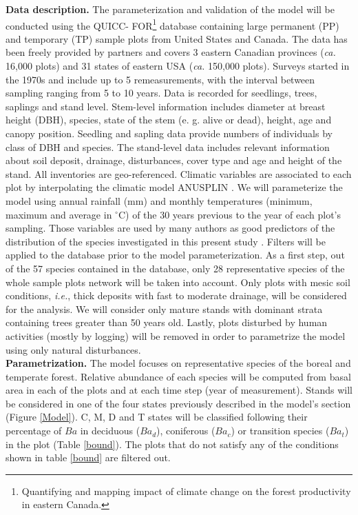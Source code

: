 \textbf{Data description.} The parameterization and validation of the model
will be conducted using the QUICC- FOR\footnote{Quantifying and mapping impact
of climate change on the forest productivity in eastern Canada.} database
containing large permanent (PP) and temporary (TP) sample plots from United
States and Canada. The data has been freely provided by partners and covers 3
eastern Canadian provinces (\textit{ca.} 16,000 plots) and 31 states of
eastern USA (\textit{ca.} 150,000 plots). Surveys started in the 1970s and
include up to 5 remeasurements, with the interval between sampling ranging
from 5 to 10 years. Data is recorded for seedlings, trees, saplings and stand
level. Stem-level information includes diameter at breast height (DBH),
species, state of the stem (e. g. alive or dead), height, age and canopy
position. Seedling and sapling data provide numbers of individuals by class of
DBH and species. The stand-level data includes relevant information about soil
deposit, drainage, disturbances, cover type and age and height of the stand.
All  inventories are geo-referenced. Climatic variables are associated to each
plot by interpolating  the climatic model ANUSPLIN \cite{McKenney2011} . We
will parameterize the model using annual rainfall (mm) and monthly
temperatures (minimum, maximum and average in \ensuremath{^\circ}C) of the 30
years previous to the year of each plot's sampling. Those variables are used
by many authors as good predictors of the distribution of the species
investigated in this present study \cite{Goldblum2010}. Filters will be
applied to the database prior to the model parameterization. As a first step,
out of the 57 species contained in the database, only 28 representative
species of the whole sample plots network will be taken into account. Only
plots with mesic soil conditions, \textit{i.e.}, thick deposits with fast to
moderate drainage, will be considered for the analysis. We will consider only
mature stands with dominant strata containing trees greater than 50 years old.
Lastly, plots disturbed by human activities (mostly by logging) will be
removed in order to parametrize the model using only natural disturbances. \\

\textbf{Parametrization.} The model focuses on representative species of the
boreal and temperate forest. Relative  abundance of each species will be
computed from basal area in each of the plots and at each time step (year of
measurement). Stands will be considered in one of the four states previously
described in the model's section (Figure \ref{Model}). C, M, D and T states
will be classified following their percentage of $Ba$ in deciduous ($Ba_d$),
coniferous ($Ba_c$) or transition species ($Ba_t$) in the plot (Table
\ref{bound}). The plots that do not satisfy any of the conditions shown in
table \ref{bound} are filtered out.\\

